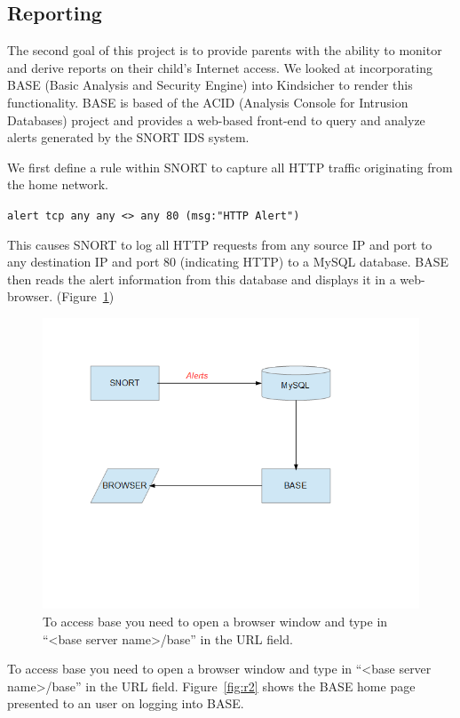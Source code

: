 \subsection{Reporting}

The second goal of this project is to provide parents with the ability to
monitor and derive reports on their child's Internet access.
%
We looked at incorporating BASE (Basic Analysis and Security Engine) into Kindsicher to
render this functionality.
%
BASE is based of the ACID (Analysis Console for Intrusion Databases) project
and provides a web-based front-end to query and analyze alerts generated by
the SNORT IDS system.

We first define a rule within SNORT to capture all HTTP traffic originating
from the home network.

\verb+alert tcp any any <> any 80 (msg:"HTTP Alert")+

This causes SNORT to log all HTTP requests from any source IP and port to any
destination IP and port 80 (indicating HTTP) to a MySQL database.
%
BASE then reads the alert information from this database and displays it in a
web-browser. (Figure~\ref{fig:r1})

\begin{figure}[!t]
    \centering
    \includegraphics[width=\columnwidth]{figures/R1_BASE_Flow}
    \caption{To access base you need to open a browser window and type in ``<base server
name>/base'' in the URL field.}
    \label{fig:r1}
\end{figure}

To access base you need to open a browser window and type in “<base server
name>/base” in the URL field.
%
Figure~\ref{fig:r2} shows the BASE home page presented to an user on logging into BASE.

